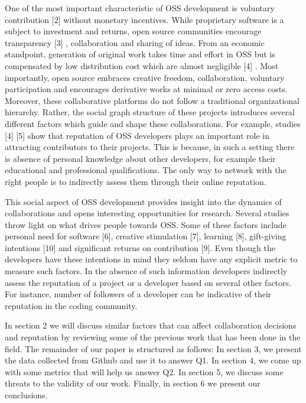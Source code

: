 One of the most important characteristic of OSS development is voluntary contribution [2] without monetary incentives. While proprietary software is a subject to investment and returns, open source communities encourage transparency [3] , collaboration and sharing of ideas. From an economic standpoint, generation of original work takes time and effort in OSS but is compensated by low distribution cost which are almost negligible [4] . Most importantly, open source embraces creative freedom, collaboration, voluntary participation and encourages derivative works at minimal or zero access costs. Moreover, these collaborative platforms do not follow a traditional organizational hierarchy. Rather, the social graph structure of these projects introduces several different factors which guide and shape these collaborations. For example, studies [4] [5] show that reputation of OSS developers plays an important role in attracting contributors to their projects. This is because, in such a setting there is absence of personal knowledge about other developers, for example their educational and professional qualifications. The only way to network with the right people is to indirectly assess them through their online reputation.

This social aspect of OSS development provides insight into the dynamics of collaborations and opens interesting opportunities for research. Several studies throw light on what drives people towards OSS. Some of these factors include personal need for software [6], creative stimulation [7], learning [8], gift-giving intentions [10] and significant returns on contribution [9]. Even though the developers have these intentions in mind they seldom have any explicit metric to measure such factors. In the absence of such information developers indirectly assess the reputation of a project or a developer based on several other factors. For instance, number of followers of a developer can be indicative of their reputation in the coding community.

In section 2 we will discuss similar factors that can affect collaboration decisions and reputation by reviewing some of the previous work that has been done in the field. The remainder of our paper is structured as follows: In section 3, we present the data collected from Github and use it to answer Q1. In section 4, we come up with some metrics that will help us answer Q2. In section 5, we discuss some threats to the validity of our work. Finally, in section 6 we present our conclusions.
